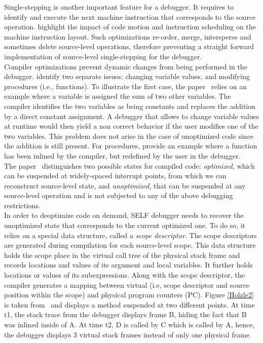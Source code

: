 Single-stepping is another important feature for a debugger. 
It requires to identify and execute the next machine instruction that corresponds to the source operation.
 highlight the impact of code motion and instruction scheduling on the machine instruction layout. 
Such optimizations re-order, merge, intersperse and sometimes delete source-level operations, therefore preventing a straight forward implementation of source-level single-stepping for the debugger.\\

Compiler optimizations prevent dynamic changes from being performed in the debugger.
 identify two separate issues: changing variable values, and modifying procedures (i.e., functions).
To illustrate the first case, the paper~\cite{holzle1992debugging} relies on an example where a variable is assigned the sum of two other variables.
The compiler identifies the two variables as being constants and replaces the addition by a direct constant assignment.
A debugger that allows to change variable values at runtime would then yield a non correct behavior if the user modifies one of the two variables. 
This problem does not arise in the case of unoptimized code since the addition is still present. 
For procedures,  provide an example where a function has been inlined by the compiler, but redefined by the user in the debugger.\\

The paper~\cite{holzle1992debugging} distinguishes two possible states for compiled code: \textit{optimized}, which can be suspended at widely-spaced interrupt points, from which we can reconstruct source-level state, and \textit{unoptimized}, that can be suspended at any source-level operation and is not subjected to any of the above debugging restrictions.\\

In order to deoptimize code on demand, SELF debugger needs to recover the unoptimized state that corresponds to the current optimized one. 
To do so, it relies on a special data structure, called a \textit{scope descriptor}. 
The scope descriptors are generated during compilation for each source-level scope. 
This data structure holds the scope place in the virtual call tree of the physical stack frame and records locations and values of its argument and local variables. 
It further holds locations or values of its subexpressions.
Along with the scope descriptor, the compiler generates a mapping between virtual (i.e, scope descriptor and source position within the scope) and physical program counters (PC).
Figure \ref{Holzle2} is taken from~\cite{holzle1992debugging} and displays a method suspended at two different points. 
At time t1, the stack trace from the debugger displays frame B, hiding the fact that B was inlined inside of A.
At time t2, D is called by C which is called by A, hence, the debugger displays 3 virtual stack frames instead of only one physical frame.\\

